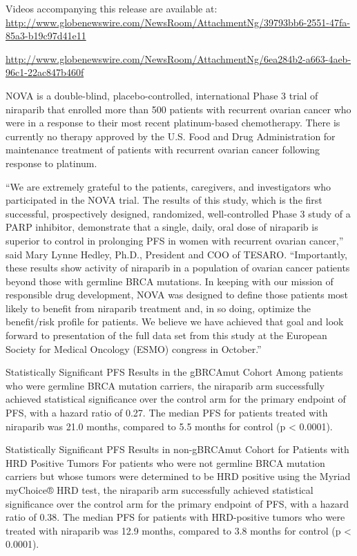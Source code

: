 \documentclass[letterpaper,12pt,english]{sphinxmanual}
\begin{document}
Videos accompanying this release are available at:
\url{http://www.globenewswire.com/NewsRoom/AttachmentNg/39793bb6-2551-47fa-85a3-b19c97d41e11}

\url{http://www.globenewswire.com/NewsRoom/AttachmentNg/6ea284b2-a663-4aeb-96c1-22ac847b460f}

NOVA is a double-blind, placebo-controlled, international Phase 3 trial of niraparib that enrolled more than 500 patients with recurrent ovarian cancer who were in a response to their most recent platinum-based chemotherapy. There is currently no therapy approved by the U.S. Food and Drug Administration for maintenance treatment of patients with recurrent ovarian cancer following response to platinum.

``We are extremely grateful to the patients, caregivers, and investigators who participated in the NOVA trial. The results of this study, which is the first successful, prospectively designed, randomized, well-controlled Phase 3 study of a PARP inhibitor, demonstrate that a single, daily, oral dose of niraparib is superior to control in prolonging PFS in women with recurrent ovarian cancer,'' said Mary Lynne Hedley, Ph.D., President and COO of TESARO. ``Importantly, these results show activity of niraparib in a population of ovarian cancer patients beyond those with germline BRCA mutations. In keeping with our mission of responsible drug development, NOVA was designed to define those patients most likely to benefit from niraparib treatment and, in so doing, optimize the benefit/risk profile for patients. We believe we have achieved that goal and look forward to presentation of the full data set from this study at the European Society for Medical Oncology (ESMO) congress in October.''

Statistically Significant PFS Results in the gBRCAmut Cohort
Among patients who were germline BRCA mutation carriers, the niraparib arm successfully achieved statistical significance over the control arm for the primary endpoint of PFS, with a hazard ratio of 0.27. The median PFS for patients treated with niraparib was 21.0 months, compared to 5.5 months for control (p \textless{} 0.0001).

Statistically Significant PFS Results in non-gBRCAmut Cohort for Patients with HRD Positive Tumors
For patients who were not germline BRCA mutation carriers but whose tumors were determined to be HRD positive using the Myriad myChoice® HRD test, the niraparib arm successfully achieved statistical significance over the control arm for the primary endpoint of PFS, with a hazard ratio of 0.38. The median PFS for patients with HRD-positive tumors who were treated with niraparib was 12.9 months, compared to 3.8 months for control (p \textless{} 0.0001).
\end{document}
